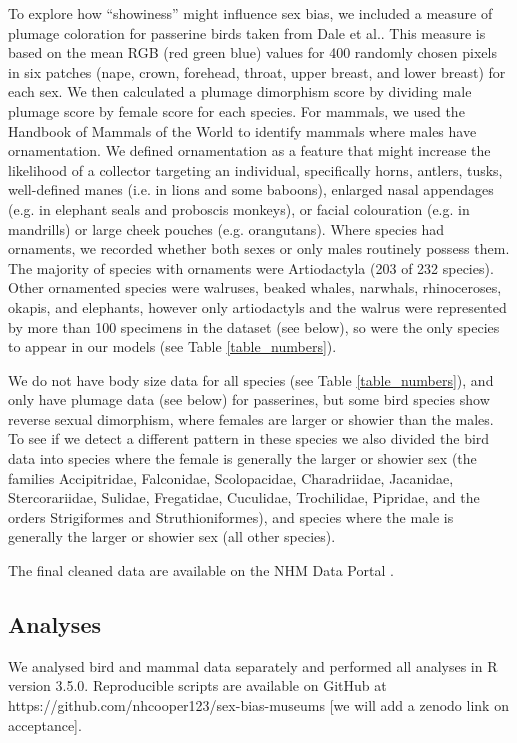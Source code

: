 \documentclass[a4paper, 12pt]{article}
\begin{document}
To explore how ``showiness'' might influence sex bias, we included a measure of plumage coloration for passerine birds taken from Dale et al.\cite{dale2015data,dale2015effects}. 
This measure is based on the mean RGB (red green blue) values for 400 randomly chosen pixels in six patches (nape, crown, forehead, throat, upper breast, and lower breast) for each sex. 
We then calculated a plumage dimorphism score by dividing male plumage score by female score for each species. 
For mammals, we used the Handbook of Mammals of the World to identify mammals where males have ornamentation. 
We defined ornamentation as a feature that might increase the likelihood of a collector targeting an individual, specifically horns, antlers, tusks, well-defined manes (i.e. in lions and some baboons), enlarged nasal appendages (e.g. in elephant seals and proboscis monkeys), or facial colouration (e.g. in mandrills) or large cheek pouches (e.g. orangutans). 
Where species had ornaments, we recorded whether both sexes or only males routinely possess them. 
The majority of species with ornaments were Artiodactyla (203 of 232 species). 
Other ornamented species were walruses, beaked whales, narwhals, rhinoceroses, okapis, and elephants, however only artiodactyls and the walrus were represented by more than 100 specimens in the dataset (see below), so were the only species to appear in our models (see Table \ref{table_numbers}).

We do not have body size data for all species (see Table \ref{table_numbers}), and only have plumage data (see below) for passerines, but some bird species show reverse sexual dimorphism, where females are larger or showier than the males. 
To see if we detect a different pattern in these species we also divided the bird data into species where the female is generally the larger or showier sex (the families  Accipitridae, Falconidae, Scolopacidae, Charadriidae, Jacanidae, Stercorariidae, Sulidae, Fregatidae, Cuculidae, Trochilidae, Pipridae, and the orders Strigiformes and Struthioniformes\cite{swaddle2000novel}), and species where the male is generally the larger or showier sex (all other species). 

The final cleaned data are available on the NHM Data Portal \cite{sex-bias-data}. 

\subsection{Analyses}
We analysed bird and mammal data separately and performed all analyses in R version 3.5.0\cite{R}. 
Reproducible scripts are available on GitHub at https://github.com/nhcooper123/sex-bias-museums [we will add a zenodo link on acceptance].
\end{document}
